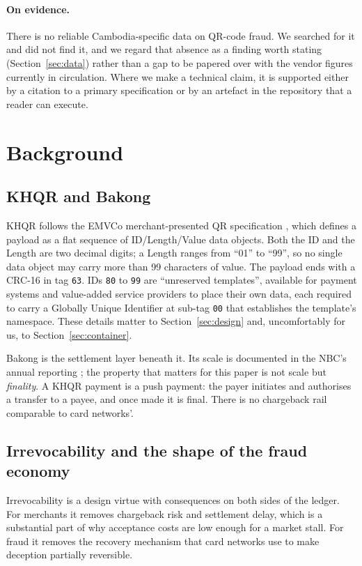 \documentclass[10pt,a4paper,twocolumn]{article}
\newcommand{\code}[1]{\texttt{\small #1}}
\begin{document}
\paragraph{On evidence.}
There is no reliable Cambodia-specific data on QR-code fraud. We searched for
it and did not find it, and we regard that absence as a finding worth stating
(Section~\ref{sec:data}) rather than a gap to be papered over with the vendor
figures currently in circulation. Where we make a technical claim, it is
supported either by a citation to a primary specification or by an artefact in
the repository that a reader can execute.

\section{Background}
\label{sec:background}

\subsection{KHQR and Bakong}

KHQR follows the EMVCo merchant-presented QR specification
\citep{emvco2017mpm}, which defines a payload as a flat sequence of
ID/Length/Value data objects. Both the ID and the Length are two decimal
digits; a Length ranges from ``01'' to ``99'', so no single data object may
carry more than 99 characters of value. The payload ends with a CRC-16 in tag
\code{63}. IDs \code{80} to \code{99} are ``unreserved templates'', available
for payment systems and value-added service providers to place their own data,
each required to carry a Globally Unique Identifier at sub-tag \code{00} that
establishes the template's namespace. These details matter to
Section~\ref{sec:design} and, uncomfortably for us, to
Section~\ref{sec:container}.

Bakong is the settlement layer beneath it. Its scale is documented in the NBC's
annual reporting \citep{nbc2025annual}; the property that matters for this
paper is not scale but \emph{finality}. A KHQR payment is a push payment: the
payer initiates and authorises a transfer to a payee, and once made it is
final. There is no chargeback rail comparable to card networks'.

\subsection{Irrevocability and the shape of the fraud economy}

Irrevocability is a design virtue with consequences on both sides of the ledger.
For merchants it removes chargeback risk and settlement delay, which is a
substantial part of why acceptance costs are low enough for a market stall. For
fraud it removes the recovery mechanism that card networks use to make deception
partially reversible.
\end{document}
